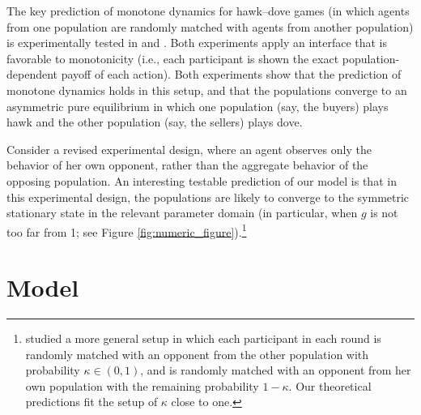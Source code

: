 \documentclass[12pt]{article}
\numberwithin{equation}{section}
\numberwithin{figure}{section}
\theoremstyle{definition}
\theoremstyle{plain}
\theoremstyle{plain}
\theoremstyle{plain}
\theoremstyle{remark}
\theoremstyle{plain}
\theoremstyle{plain}
\begin{document}
The key prediction of monotone dynamics for hawk–dove games (in which agents from one population are randomly matched with agents from another population) is experimentally tested in \cite{oprea2011separating} and \cite{benndorf2016equilibrium}. Both experiments apply an interface that is favorable to monotonicity (i.e., each participant is shown the exact population-dependent payoff of each action). Both experiments show that the prediction of monotone dynamics holds in this setup, and that the populations converge to an asymmetric pure equilibrium in which one population (say, the buyers) plays hawk and the other population (say, the sellers) plays dove. 

Consider a revised experimental design, where an agent observes only the behavior of her own opponent, rather than the aggregate behavior of the opposing population. An interesting testable prediction of our model is that in this experimental design, the populations are likely to converge to the symmetric stationary state in the relevant parameter domain (in particular, when $g$ is not too far from 1; see Figure
\ref{fig:numeric_figure}).\footnote{\cite{benndorf2016equilibrium, benndorf2021games} 
studied a more general setup in which each participant in each round is randomly matched with an opponent from the other population with probability $\kappa \in (0,1)$, and is randomly matched with an opponent from her own population with the remaining probability $1-\kappa$. Our theoretical  predictions fit the setup of $\kappa$ close to one.}


\section{Model}\label{sec:model}
\end{document}
